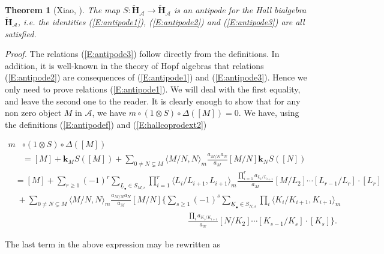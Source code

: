 \documentclass[a4paper,10pt]{amsart}
\def\H{\mathbf{H}}
\def\A{\mathcal{A}}
\newtheorem{theo}{\bf{Theorem}}[section]
\numberwithin{equation}{section}
\begin{document}
\begin{theo}[Xiao, \cite{Xiao1}] The map $S: \widetilde{\H}_{\A} \to \widetilde{\H}_{\A} $ is an antipode for the Hall bialgebra $\widetilde{\H}_{\A}$, i.e. the identities (\ref{E:antipode1}), (\ref{E:antipode2}) and (\ref{E:antipode3}) are all satisfied.\end{theo}

\noindent
\textit{Proof.} The relations (\ref{E:antipode3}) follow directly from the definitions. In addition, it is well-known in the theory of Hopf algebras that relations (\ref{E:antipode2}) are consequences of (\ref{E:antipode1}) and (\ref{E:antipode3}). Hence we only need to prove relations (\ref{E:antipode1}). We will deal with the first equality, and leave the second one to the reader. It is clearly enough to show that for any non zero object $M$ in $\mathcal{A}$, we have $m \circ (1 \otimes S) \circ {\Delta} ([M])=0$. We have, using the definitions (\ref{E:antipodef}) and (\ref{E:hallcoprodext2})

\begin{equation}\label{E:proofantipode}
\begin{split}
m& \circ (1 \otimes S) \circ {\Delta}([M])\\
&= [M] + \mathbf{k}_MS([M]) +\sum_{0 \neq N \subsetneq M} \langle M/N,N \rangle_m \frac{a_{M/N}a_N}{a_M} [M/N] \mathbf{k}_N S([N])
\end{split}
\end{equation}
\begin{equation*}
\begin{split}
&=[M] + \sum_{r \geq 1} (-1)^r \sum_{\underline{L}_{\bullet} \in S_{M,r}} \prod_{i=1}^r \langle L_i/L_{i+1}, L_{i+1} \rangle_m \frac{\prod_{i=1}^r a_{L_i/L_{i+1}}}{a_M} [M/L_2] \cdots [L_{r-1}/L_r] \cdot [L_r] \\
& \; + \sum_{0 \neq N \subsetneq M} \langle M/N,N \rangle_m \frac{a_{M/N}a_N}{a_M} [M/N] \bigg\{
\sum_{s \geq 1} (-1)^s \sum_{\underline{K}_{\bullet} \in S_{N,s}} \prod_i \langle K_i/K_{i+1},K_{i+1} \rangle_m \\
&\qquad \qquad \qquad \qquad \qquad \qquad \qquad \; \;\qquad \qquad \qquad  \frac{\prod_i a_{K_i/K_{i+1}}}{a_N} [N/K_2] \cdots [K_{s-1}/K_s] \cdot [K_s] \bigg\}.
\end{split}
\end{equation*}

The last term in the above expression may be rewritten as
\end{document}
